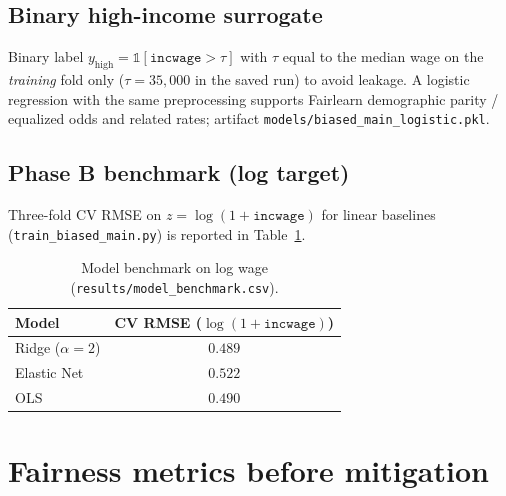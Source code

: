 \documentclass[sigconf,nonacm]{acmart}
\begin{document}
\subsection{Binary high-income surrogate}
Binary label $y_{\mathrm{high}}=\mathbb{1}[\texttt{incwage}>\tau]$ with $\tau$ equal to the median wage on the \emph{training} fold only ($\tau=35{,}000$ in the saved run) to avoid leakage.
A logistic regression with the same preprocessing supports Fairlearn demographic parity / equalized odds and related rates; artifact \texttt{models/biased\_main\_logistic.pkl}.

\subsection{Phase B benchmark (log target)}
Three-fold CV RMSE on $z=\log(1+\texttt{incwage})$ for linear baselines (\texttt{train\_biased\_main.py}) is reported in Table~\ref{tab:bench}.

\begin{table}[h]
\centering
\begin{tabular}{lc}
\toprule
Model & CV RMSE ($\log(1+\texttt{incwage})$) \\
\midrule
Ridge ($\alpha{=}2$) & $0.489$ \\
Elastic Net & $0.522$ \\
OLS & $0.490$ \\
\bottomrule
\end{tabular}
\caption{Model benchmark on log wage (\texttt{results/model\_benchmark.csv}).}
\label{tab:bench}
\end{table}

\section{Fairness metrics before mitigation}
\end{document}
